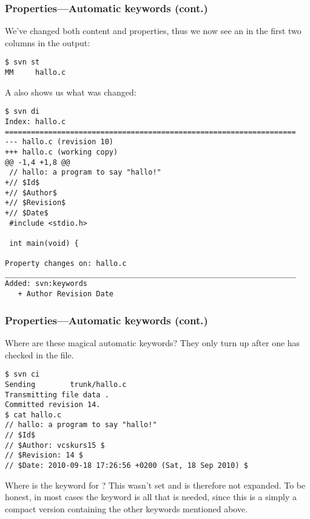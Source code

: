 \begin{frame}[fragile]
    \frametitle{Properties---Automatic keywords (cont.)}
    \linuxframe
    \vspace*{-3mm}
    We've changed both content and properties, thus we now see an
     in the first two columns in the  output:
\begin{lstlisting}[basicstyle=\tiny\ttfamily\color{black}]
$ svn st
MM     hallo.c
\end{lstlisting}

    A  also shows us what was changed:
\begin{lstlisting}[basicstyle=\tiny\ttfamily\color{black}]
$ svn di
Index: hallo.c
===================================================================
--- hallo.c (revision 10)
+++ hallo.c (working copy)
@@ -1,4 +1,8 @@
 // hallo: a program to say "hallo!"
+// $Id$
+// $Author$
+// $Revision$
+// $Date$
 #include <stdio.h>
 
 int main(void) {

Property changes on: hallo.c
___________________________________________________________________
Added: svn:keywords
   + Author Revision Date
\end{lstlisting}
\end{frame}

\begin{frame}[fragile]
    \frametitle{Properties---Automatic keywords (cont.)}
    \linuxframe

    Where are these magical automatic keywords?  They only turn up after one
    has checked in the file.
\begin{lstlisting}[basicstyle=\tiny\ttfamily\color{black}]
$ svn ci
Sending        trunk/hallo.c
Transmitting file data .
Committed revision 14.
$ cat hallo.c
// hallo: a program to say "hallo!"
// $Id$
// $Author: vcskurs15 $
// $Revision: 14 $
// $Date: 2010-09-18 17:26:56 +0200 (Sat, 18 Sep 2010) $
\end{lstlisting}

    Where is the keyword for ?  This wasn't set and is therefore
    not expanded.  To be honest, in most cases the  keyword is
    all that is needed, since this is a simply a compact version containing
    the other keywords mentioned above.
\end{frame}

